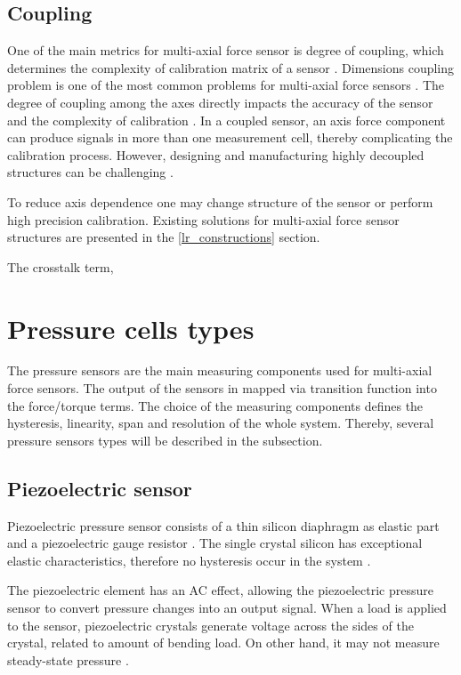 \subsection{Coupling}
\label{lr_coupling}

One of the main metrics for multi-axial force sensor is degree of coupling, which determines the complexity of calibration matrix of a sensor 
\cite{decoupling_sliding_structure,multi_axis_force_sensors_review,CHAO1997105}. 
Dimensions coupling problem is one of the most common problems for multi-axial force sensors \cite{NN_decoupling}.
The degree of coupling among the axes directly impacts the accuracy of the sensor and the complexity of calibration 
\cite{decoupling_sliding_structure, multi_axis_force_sensors_review, CHAO1997105}. 
In a coupled sensor, an axis force component can produce signals in more than one measurement cell, 
thereby complicating the calibration process. However, designing and manufacturing highly decoupled structures can be challenging 
\cite{shape_optimization_decoupled}.

To reduce axis dependence one may change structure of the sensor or perform high precision calibration. 
Existing solutions for multi-axial force sensor structures are presented in the \ref{lr_constructions} section.

The crosstalk term, \cite{ISO_cross_talk}

\section{Pressure cells types}
\label{lr_pressure_cell_types}
The pressure sensors are the main measuring components used for multi-axial force sensors. The output of the sensors in mapped via transition function into the force/torque terms. 
The choice of the measuring components defines the hysteresis, linearity, span and resolution of the whole system. 
Thereby, several pressure sensors types will be described in the subsection.

\subsection{Piezoelectric sensor}
Piezoelectric pressure sensor consists of a thin silicon diaphragm as elastic part and a piezoelectric gauge resistor \cite{handbook_sensors}.
The single crystal silicon has exceptional elastic characteristics, therefore no hysteresis occur in the system \cite{handbook_sensors}.

The piezoelectric element has an AC effect, allowing the piezoelectric pressure sensor to convert pressure changes into an output signal. 
When a load is applied to the sensor, piezoelectric crystals generate voltage across the sides of the crystal, related to amount of bending load.
On other hand, it may not measure steady-state pressure \cite{handbook_sensors}. 

